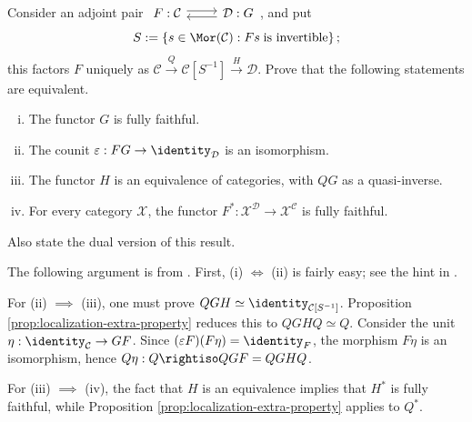 \begin{Exercises}
	\item Consider an adjoint pair
	$\begin{tikzcd}
		F: \mathcal{C} \arrow[r, shift left] & \mathcal{D} \arrow[l, shift left] : G
	\end{tikzcd}$,
	and put
	\[ S := \left\{ s \in \Mor(\mathcal{C}): Fs \;\text{is invertible} \right\}; \]
	this factors $F$ uniquely as
	$\mathcal{C}\xrightarrow{Q}\mathcal{C}[S^{-1}]\xrightarrow{H}\mathcal{D}$.
	Prove that the following statements are equivalent.
	\begin{enumerate}[(i)]
		\item The functor $G$ is fully faithful.
		\item The counit $\varepsilon:FG\to\identity_{\mathcal{D}}$ is an
		isomorphism.
		\item The functor $H$ is an equivalence of categories, with $QG$ as a
		quasi-inverse.
		\item For every category $\mathcal{X}$, the functor
		$F^*:\mathcal{X}^{\mathcal{D}}\to\mathcal{X}^{\mathcal{C}}$ is fully
		faithful.
	\end{enumerate}
	Also state the dual version of this result.

	\begin{hint}
		The following argument is from \cite[I.1.3 Proposition]{GZ67}. First,
		(i) $\iff$ (ii) is fairly easy; see the hint in
		\cite[Chapter 2, Exercise 8]{Li1}.

		For (ii) $\implies$ (iii), one must prove
		$QGH\simeq\identity_{\mathcal{C}[S^{-1}]}$. Proposition
		\ref{prop:localization-extra-property} reduces this to
		$QGHQ\simeq Q$. Consider the unit
		$\eta:\identity_{\mathcal{C}}\to GF$. Since
		$(\varepsilon F)(F\eta)=\identity_F$, the morphism $F\eta$ is an
		isomorphism, hence $Q\eta:Q\rightiso QGF=QGHQ$.

		For (iii) $\implies$ (iv), the fact that $H$ is an equivalence implies
		that $H^*$ is fully faithful, while Proposition
		\ref{prop:localization-extra-property} applies to $Q^*$.


\end{hint}
\end{Exercises}
